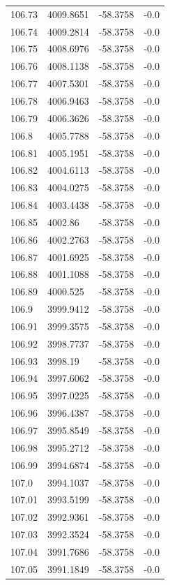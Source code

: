 \begin{table}[H]
\begin{tabular}{llll}
106.73 & 4009.8651 & -58.3758 & -0.0 \\
106.74 & 4009.2814 & -58.3758 & -0.0 \\
106.75 & 4008.6976 & -58.3758 & -0.0 \\
106.76 & 4008.1138 & -58.3758 & -0.0 \\
106.77 & 4007.5301 & -58.3758 & -0.0 \\
106.78 & 4006.9463 & -58.3758 & -0.0 \\
106.79 & 4006.3626 & -58.3758 & -0.0 \\
106.8 & 4005.7788 & -58.3758 & -0.0 \\
106.81 & 4005.1951 & -58.3758 & -0.0 \\
106.82 & 4004.6113 & -58.3758 & -0.0 \\
106.83 & 4004.0275 & -58.3758 & -0.0 \\
106.84 & 4003.4438 & -58.3758 & -0.0 \\
106.85 & 4002.86 & -58.3758 & -0.0 \\
106.86 & 4002.2763 & -58.3758 & -0.0 \\
106.87 & 4001.6925 & -58.3758 & -0.0 \\
106.88 & 4001.1088 & -58.3758 & -0.0 \\
106.89 & 4000.525 & -58.3758 & -0.0 \\
106.9 & 3999.9412 & -58.3758 & -0.0 \\
106.91 & 3999.3575 & -58.3758 & -0.0 \\
106.92 & 3998.7737 & -58.3758 & -0.0 \\
106.93 & 3998.19 & -58.3758 & -0.0 \\
106.94 & 3997.6062 & -58.3758 & -0.0 \\
106.95 & 3997.0225 & -58.3758 & -0.0 \\
106.96 & 3996.4387 & -58.3758 & -0.0 \\
106.97 & 3995.8549 & -58.3758 & -0.0 \\
106.98 & 3995.2712 & -58.3758 & -0.0 \\
106.99 & 3994.6874 & -58.3758 & -0.0 \\
107.0 & 3994.1037 & -58.3758 & -0.0 \\
107.01 & 3993.5199 & -58.3758 & -0.0 \\
107.02 & 3992.9361 & -58.3758 & -0.0 \\
107.03 & 3992.3524 & -58.3758 & -0.0 \\
107.04 & 3991.7686 & -58.3758 & -0.0 \\
107.05 & 3991.1849 & -58.3758 & -0.0 \\

\end{tabular}
\end{table}
